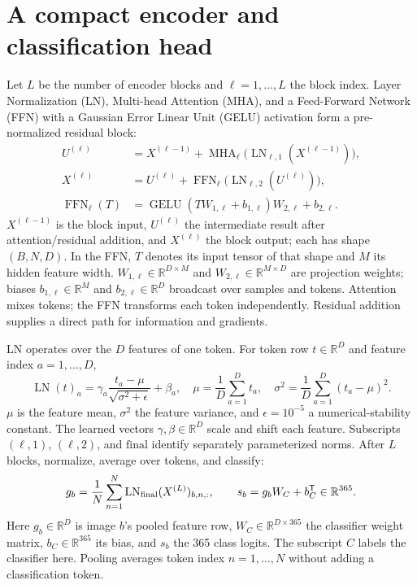 \documentclass[11pt,a4paper,oneside]{report}
\newcommand{\R}{\mathbb{R}}
\newcommand{\LN}{\operatorname{LN}}
\newcommand{\MHA}{\operatorname{MHA}}
\newcommand{\FFN}{\operatorname{FFN}}
\begin{document}
\section{A compact encoder and classification head}
Let $L$ be the number of encoder blocks and $\ell=1,\ldots,L$ the block
index. Layer Normalization (LN), Multi-head Attention (MHA), and a
Feed-Forward Network (FFN) with a Gaussian Error Linear Unit (GELU)
activation form a pre-normalized residual block:
\begin{align}
 U^{(\ell)}&=X^{(\ell-1)}+
   \MHA_\ell\bigl(\LN_{\ell,1}(X^{(\ell-1)})\bigr),\\
 X^{(\ell)}&=U^{(\ell)}+
   \FFN_\ell\bigl(\LN_{\ell,2}(U^{(\ell)})\bigr),\\
 \FFN_\ell(T)&=\operatorname{GELU}(TW_{1,\ell}+b_{1,\ell})
                         W_{2,\ell}+b_{2,\ell}.
\end{align}
$X^{(\ell-1)}$ is the block input, $U^{(\ell)}$ the intermediate result after
attention/residual addition, and $X^{(\ell)}$ the block output; each has shape
$(B,N,D)$. In the FFN, $T$ denotes its input tensor of that shape and $M$ its
hidden feature width. $W_{1,\ell}\in\R^{D\times M}$ and
$W_{2,\ell}\in\R^{M\times D}$ are projection weights; biases
$b_{1,\ell}\in\R^M$ and $b_{2,\ell}\in\R^D$ broadcast over samples and tokens.
Attention mixes tokens; the FFN transforms each token independently.
Residual addition supplies a direct path for information and gradients.

LN operates over the $D$ features of one token. For token row $t\in\R^D$
and feature index $a=1,\ldots,D$,
\begin{equation}
 \LN(t)_a=\gamma_a\frac{t_a-\mu}{\sqrt{\sigma^2+\epsilon}}+\beta_a,
 \quad \mu=\frac1D\sum_{a=1}^{D} t_a,\quad
 \sigma^2=\frac1D\sum_{a=1}^{D}(t_a-\mu)^2.
\end{equation}
$\mu$ is the feature mean, $\sigma^2$ the feature variance, and
$\epsilon=10^{-5}$ a numerical-stability constant. The learned vectors
$\gamma,\beta\in\R^D$ scale and shift each feature. Subscripts $(\ell,1)$,
$(\ell,2)$, and $\mathrm{final}$ identify separately parameterized norms.
After $L$ blocks, normalize, average over tokens, and classify:
\begin{equation}
 g_b=\frac1N\sum_{n=1}^N\LN_{\rm final}(X^{(L)})_{b,n,:},
 \qquad s_b=g_bW_C+b_C^{\mathsf T}\in\R^{365}.
\end{equation}
Here $g_b\in\R^D$ is image $b$'s pooled feature row, $W_C\in\R^{D\times365}$
the classifier weight matrix, $b_C\in\R^{365}$ its bias, and $s_b$ the
365 class logits. The subscript $C$ labels the classifier here. Pooling averages
token index $n=1,\ldots,N$ without adding a classification token.
\end{document}
